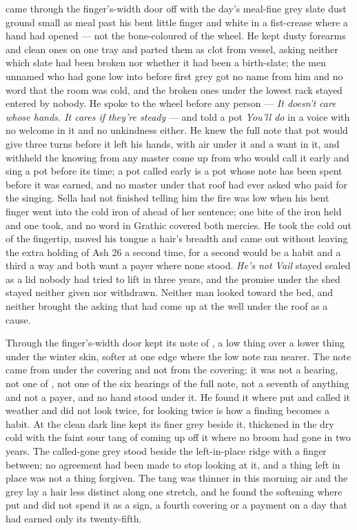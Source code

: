  came through the finger's-width door off  with the day's meal-fine grey slate dust ground small as meal past his bent little finger and white in a fist-crease where a hand had opened --- not the bone-coloured  of the wheel. He kept dusty forearms and clean ones on one tray and parted them as clot from vessel, asking neither which slate had been broken nor whether it had been a birth-slate; the men unnamed who had gone low into  before first grey got no name from him and no word that the room was cold, and the broken ones under the lowest rack stayed entered by nobody. He spoke to the wheel before any person --- \emph{It doesn't care whose hands. It cares if they're steady} --- and told a pot \emph{You'll do} in a voice with no welcome in it and no unkindness either. He knew the full note that pot would give three turns before it left his hands, with air under it and a want in it, and withheld the knowing from any master come up from  who would call it early and sing a pot before its time; a pot called early is a pot whose note has been spent before it was earned, and no master under that roof had ever asked who paid for the singing. Sella had not finished telling him the fire was low when his bent finger went into the cold iron of  ahead of her sentence; one bite of the iron held and one took, and no word in Grathic covered both mercies. He took the cold out of the fingertip, moved his tongue a hair's breadth and came out without leaving the extra holding of Ash 26 a second time, for a second would be a habit and a third a way and both want a payer where none stood. \emph{He's not Vail} stayed sealed as a lid nobody had tried to lift in three years, and the promise under the shed stayed neither given nor withdrawn. Neither man looked toward the bed, and neither brought the asking that had come up at the well under the roof as a cause.

\scenebreak

Through the finger's-width door  kept its note of , a low thing over a lower thing under the winter skin, softer at one edge where the low note ran nearer. The note came from under the covering and not from the covering; it was not a hearing, not one of , not one of the six hearings of the full note, not a seventh of anything and not a payer, and no hand stood under it. He found it where put and called it weather and did not look twice, for looking twice is how a finding becomes a habit. At  the clean dark line kept its finer grey beside it, thickened in the dry cold with the faint sour tang of  coming up off it where no broom had gone in two years. The called-gone grey stood beside the left-in-place ridge with a finger between; no agreement had been made to stop looking at it, and a thing left in place was not a thing forgiven. The tang was thinner in this morning air and the grey lay a hair less distinct along one stretch, and he found the softening where put and did not spend it as a sign, a fourth covering or a payment on a day that had earned only its twenty-fifth.

